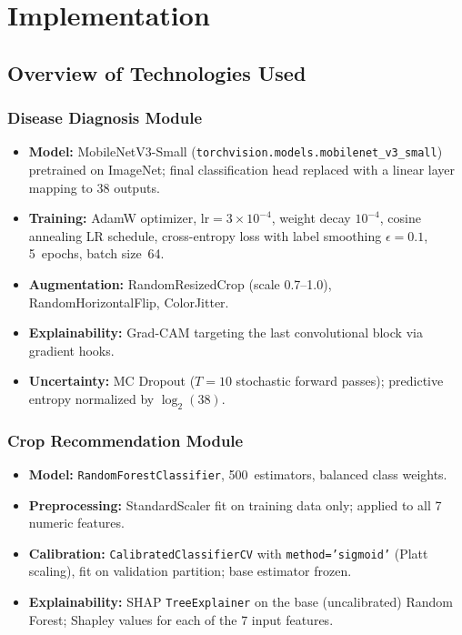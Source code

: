 \documentclass[12pt,a4paper]{report}
\begin{document}
\chapter{Implementation}

\section{Overview of Technologies Used}

\subsection{Disease Diagnosis Module}
\begin{itemize}[leftmargin=*]
  \item \textbf{Model:} MobileNetV3-Small (\texttt{torchvision.models.mobilenet\_v3\_small}) pretrained on ImageNet; final classification head replaced with a linear layer mapping to 38 outputs.
  \item \textbf{Training:} AdamW optimizer, $\text{lr}=3\times10^{-4}$, weight decay $10^{-4}$, cosine annealing LR schedule, cross-entropy loss with label smoothing $\epsilon=0.1$, 5~epochs, batch size~64.
  \item \textbf{Augmentation:} RandomResizedCrop (scale 0.7--1.0), RandomHorizontalFlip, ColorJitter.
  \item \textbf{Explainability:} Grad-CAM targeting the last convolutional block via gradient hooks.
  \item \textbf{Uncertainty:} MC Dropout ($T=10$ stochastic forward passes); predictive entropy normalized by $\log_2(38)$.
\end{itemize}

\subsection{Crop Recommendation Module}
\begin{itemize}[leftmargin=*]
  \item \textbf{Model:} \texttt{RandomForestClassifier}, 500~estimators, balanced class weights.
  \item \textbf{Preprocessing:} StandardScaler fit on training data only; applied to all 7 numeric features.
  \item \textbf{Calibration:} \texttt{CalibratedClassifierCV} with \texttt{method='sigmoid'} (Platt scaling), fit on validation partition; base estimator frozen.
  \item \textbf{Explainability:} SHAP \texttt{TreeExplainer} on the base (uncalibrated) Random Forest; Shapley values for each of the 7 input features.
\end{itemize}
\end{document}
